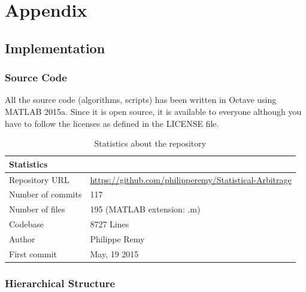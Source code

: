\documentclass[11pt,a4,twosided,singlespacing,titlepagenumber=on]{scrreprt}
\numberwithin{equation}{chapter} %
\theoremstyle{remark}
\begin{document}
\chapter{Appendix}

\section{Implementation}

\subsection{Source Code}
\label{app:implementation}
All the source code (algorithms, scripts) has been written in Octave using MATLAB 2015a. Since it is open source, it is available to everyone although you have to follow the licenses as defined in the LICENSE file.

\begin{table}[H]
\centering
\begin{tabular}{ll}
\hline
\multicolumn{1}{|l}{Statistics}     & \multicolumn{1}{l|}{} \\ \hline
Repository URL 					   &  \url{https://github.com/philipperemy/Statistical-Arbitrage} \\
Number of commits   			 &  117 \\
Number of files   				 &  195 (MATLAB extension: .m) \\
Codebase   				         &  8727 Lines\\
Author          &  Philippe Remy \\
First commit & May, 19 2015 \\
\hline
\end{tabular}
\caption{Statistics about the repository}
\label{Statistics_repository}
\end{table}

\subsection{Hierarchical Structure}
\end{document}
